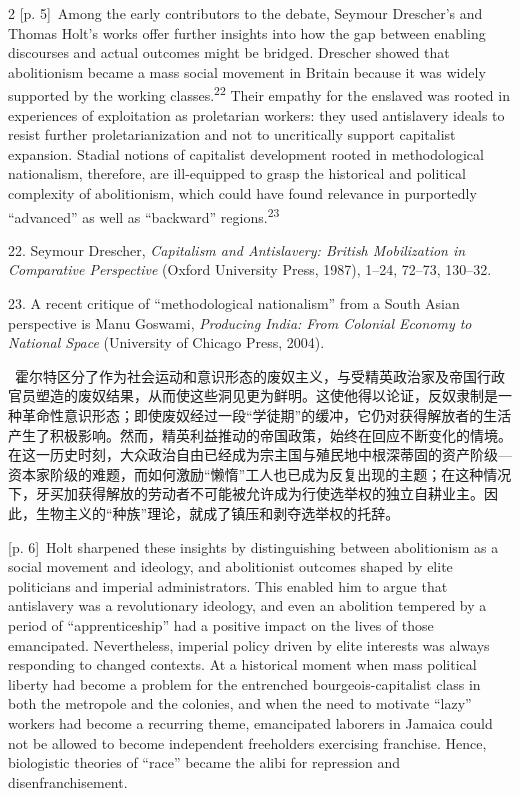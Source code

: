 \documentclass[10pt,a4paper]{article}
\begin{document}
\begin{paracol}{2}
{\scriptsize\color{gray} [p. 5]}\ Among the early contributors to the debate, Seymour Drescher’s and Thomas Holt’s works offer further insights into how the gap between enabling discourses and actual outcomes might be bridged. Drescher showed that abolitionism became a mass social movement in Britain because it was widely supported by the working classes.\nobreak\textsuperscript{22} Their empathy for the enslaved was rooted in experiences of exploitation as proletarian workers: they used antislavery ideals to resist further proletarianization and not to uncritically support capitalist expansion. Stadial notions of capitalist development rooted in methodological nationalism, therefore, are ill-equipped to grasp the historical and political complexity of abolitionism, which could have found relevance in purportedly “advanced” as well as “backward” regions.\nobreak\textsuperscript{23}\par{\small 22. Seymour Drescher, \textit{Capitalism and Antislavery: British Mobilization in Comparative Perspective} (Oxford University Press, 1987), 1–24, 72–73, 130–32.\par}{\small 23. A recent critique of “methodological nationalism” from a South Asian perspective is Manu Goswami, \textit{Producing India: From Colonial Economy to National Space} (University of Chicago Press, 2004).\par}
\switchcolumn*
{\scriptsize\color{gray} [p. 6]}\ 霍尔特区分了作为社会运动和意识形态的废奴主义，与受精英政治家及帝国行政官员塑造的废奴结果，从而使这些洞见更为鲜明。这使他得以论证，反奴隶制是一种革命性意识形态；即使废奴经过一段“学徒期”的缓冲，它仍对获得解放者的生活产生了积极影响。然而，精英利益推动的帝国政策，始终在回应不断变化的情境。在这一历史时刻，大众政治自由已经成为宗主国与殖民地中根深蒂固的资产阶级—资本家阶级的难题，而如何激励“懒惰”工人也已成为反复出现的主题；在这种情况下，牙买加获得解放的劳动者不可能被允许成为行使选举权的独立自耕业主。因此，生物主义的“种族”理论，就成了镇压和剥夺选举权的托辞。\par
\switchcolumn
{\scriptsize\color{gray} [p. 6]}\ Holt sharpened these insights by distinguishing between abolitionism as a social movement and ideology, and abolitionist outcomes shaped by elite politicians and imperial administrators. This enabled him to argue that antislavery was a revolutionary ideology, and even an abolition tempered by a period of “apprenticeship” had a positive impact on the lives of those emancipated. Nevertheless, imperial policy driven by elite interests was always responding to changed contexts. At a historical moment when mass political liberty had become a problem for the entrenched bourgeois-capitalist class in both the metropole and the colonies, and when the need to motivate “lazy” workers had become a recurring theme, emancipated laborers in Jamaica could not be allowed to become independent freeholders exercising franchise. Hence, biologistic theories of “race” became the alibi for repression and disenfranchisement.\par

\end{paracol}
\end{document}
